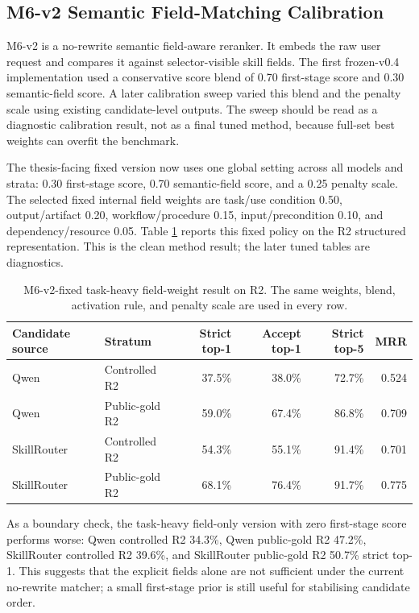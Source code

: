 \subsection{M6-v2 Semantic Field-Matching Calibration}

M6-v2 is a no-rewrite semantic field-aware reranker. It embeds the raw user request and compares it against selector-visible skill fields. The first frozen-v0.4 implementation used a conservative score blend of 0.70 first-stage score and 0.30 semantic-field score. A later calibration sweep varied this blend and the penalty scale using existing candidate-level outputs. The sweep should be read as a diagnostic calibration result, not as a final tuned method, because full-set best weights can overfit the benchmark.

The thesis-facing fixed version now uses one global setting across all models and strata: 0.30 first-stage score, 0.70 semantic-field score, and a 0.25 penalty scale. The selected fixed internal field weights are task/use condition 0.50, output/artifact 0.20, workflow/procedure 0.15, input/precondition 0.10, and dependency/resource 0.05. Table \ref{tab:m6v2-fixed-global-v04} reports this fixed policy on the R2 structured representation. This is the clean method result; the later tuned tables are diagnostics.

\begin{table}[h]
\centering
\scriptsize
\begin{tabular}{p{}p{}rrrr}
\toprule
Candidate source & Stratum & Strict top-1 & Accept top-1 & Strict top-5 & MRR \\
\midrule
Qwen & Controlled R2 & 37.5\% & 38.0\% & 72.7\% & 0.524 \\
Qwen & Public-gold R2 & 59.0\% & 67.4\% & 86.8\% & 0.709 \\
SkillRouter & Controlled R2 & 54.3\% & 55.1\% & 91.4\% & 0.701 \\
SkillRouter & Public-gold R2 & 68.1\% & 76.4\% & 91.7\% & 0.775 \\
\bottomrule
\end{tabular}
\caption{M6-v2-fixed task-heavy field-weight result on R2. The same weights, blend, activation rule, and penalty scale are used in every row.}
\label{tab:m6v2-fixed-global-v04}
\end{table}

As a boundary check, the task-heavy field-only version with zero first-stage score performs worse: Qwen controlled R2 34.3\%, Qwen public-gold R2 47.2\%, SkillRouter controlled R2 39.6\%, and SkillRouter public-gold R2 50.7\% strict top-1. This suggests that the explicit fields alone are not sufficient under the current no-rewrite matcher; a small first-stage prior is still useful for stabilising candidate order.

